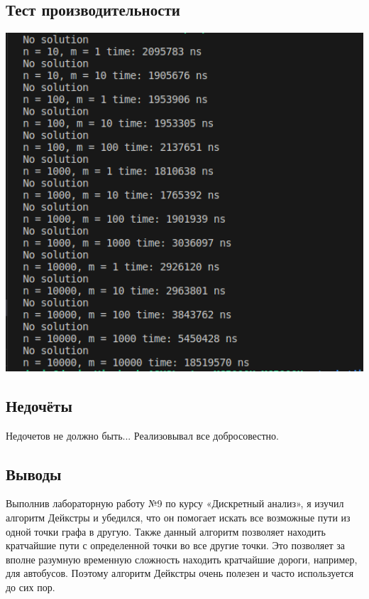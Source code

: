\documentclass[12pt]{article}
\begin{document}
\subsection*{Тест производительности}

\includegraphics[width=7in]{test.png}

\subsection*{Недочёты}

Недочетов не должно быть... Реализовывал все добросовестно.

\subsection*{Выводы}

Выполнив лабораторную работу №9 по курсу «Дискретный анализ», я изучил
алгоритм Дейкстры и убедился, что он помогает искать все возможные пути
из одной точки графа в другую. Также данный алгоритм позволяет находить кратчайшие пути с определенной точки во все другие точки. 
Это позволяет за вполне разумную временную сложность находить кратчайшие дороги, например, для автобусов. Поэтому алгоритм Дейкстры очень полезен и часто используется до сих пор.
\end{document}
